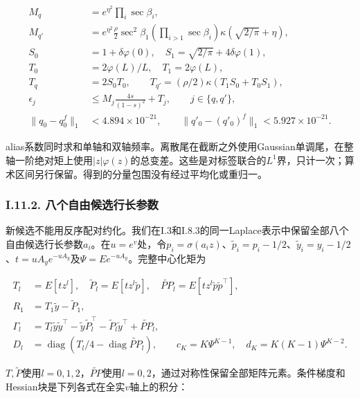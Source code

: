 \documentclass[11pt,a4paper]{article}
\begin{document}
\[
\begin{aligned}
M_q&=e^{\eta^2}\prod_i\sec\beta_i,\\
M_{q'}&=e^{\eta^2}\frac\rho2\sec^2\beta_1
\left(\prod_{i>1}\sec\beta_i\right)\kappa(\sqrt{2/\pi}+\eta),\\
S_0&=1+\delta\varphi(0),\quad S_1=\sqrt{2/\pi}+4\delta\varphi(1),\\
T_0&=2\varphi(L)/L,\quad T_1=2\varphi(L),\\
T_q&=2S_0T_0,\qquad T_{q'}=(\rho/2)\kappa(T_1S_0+T_0S_1),\\
\epsilon_j&\le M_j\frac{4s}{(1-s)^2}+T_j,\qquad j\in\{q,q'\},\\
\|q_0-q_0^f\|_1&<4.894\times10^{-21},\qquad
\|q'_0-(q'_0)^f\|_1<5.927\times10^{-21}.
\end{aligned}
\tag{I.57}
\]

alias系数同时求和单轴和双轴频率。离散尾在截断之外使用Gaussian单调尾，在整轴一阶绝对矩上使用\(|z|\varphi(z)\)的总变差。这些是对标签联合的\(L^1\)界，只计一次；算术区间另行保留。得到的分量包围没有经过平均化或重归一。

\subsubsection*{I.11.2.
八个自由候选行长参数}\label{i.11.2.-ux516bux4e2aux81eaux7531ux5019ux9009ux884cux957fux53c2ux6570}

新候选不能用反序配对约化。我们在I.3和I.8.3的同一Laplace表示中保留全部八个自由候选行长参数\(a_i\)。在\(u=e^v\)处，令\(p_i=\sigma(a_i z)\)、\(\widetilde p_i=p_i-1/2\)、\(\widetilde y_i=y_i-1/2\)、\(t=uA_y e^{-uA_y}\)及\(\Psi=E e^{-uA_y}\)。完整中心化矩为

\[
\begin{aligned}
T_l&=E[tz^l],\quad \widetilde P_l=E[tz^l\widetilde p],\quad
\widetilde{PP}_l=E[tz^l\widetilde p\widetilde p^\top],\\
R_1&=T_1\widetilde y-\widetilde P_1,\\
\Gamma_l&=T_l\widetilde y\widetilde y^\top
-\widetilde y\widetilde P_l^\top-\widetilde P_l\widetilde y^\top
+\widetilde{PP}_l,\\
D_l&=\operatorname{diag}(T_l/4-\operatorname{diag}\widetilde{PP}_l),\qquad
c_K=K\Psi^{K-1},\quad d_K=K(K-1)\Psi^{K-2}.
\end{aligned}
\tag{I.58}
\]

\(T,\widetilde P\)使用\(l=0,1,2\)，\(\widetilde{PP}\)使用\(l=0,2\)，通过对称性保留全部矩阵元素。条件梯度和Hessian块是下列各式在全实\(v\)轴上的积分：
\end{document}
